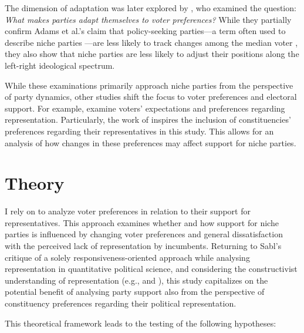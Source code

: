 The dimension of adaptation was later explored by \textcite{bischof2020}, who examined the question: \textit{What makes parties adapt themselves to voter preferences?} While they partially confirm Adams et al.’s claim that policy-seeking parties—a term often used to describe niche parties \parencite[515]{adams2006}—are less likely to track changes among the median voter \parencite[9]{bischof2020}, they also show that niche parties are less likely to adjust their positions along the left-right ideological spectrum.

While these examinations primarily approach niche parties from the perspective of party dynamics, other studies shift the focus to voter preferences and electoral support. For example, \textcite{wolak2017, blumenau2024, costa2021} examine voters’ expectations and preferences regarding representation. Particularly, the work of \textcite{blumenau2024} inspires the inclusion of constituencies’ preferences regarding their representatives in this study. This allows for an analysis of how changes in these preferences may affect support for niche parties.


\section{Theory}\label{sec:Theory} %
I rely on \textcite{blumenau2024} to analyze voter preferences in relation to their support for representatives. This approach examines whether and how support for niche parties is influenced by changing voter preferences and general dissatisfaction with the perceived lack of representation by incumbents. Returning to Sabl's \parencite*[]{sabl2015} critique of a solely responsiveness-oriented approach while analysing representation in quantitative political science, and considering the constructivist understanding of representation (e.g., \textcite{saward2010} and \textcite{disch2015}), this study capitalizes on the potential benefit of analysing party support also from the perspective of constituency preferences regarding their political representation.

This theoretical framework leads to the testing of the following hypotheses:

